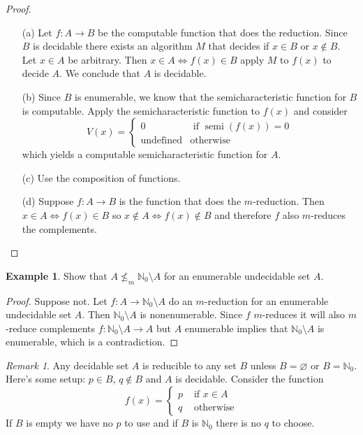 \documentclass[10pt, letterpaper]{article}
\newcommand{\N}{\mathbb{N}}
\theoremstyle{remark}
\newtheorem{rem}{Remark}
\theoremstyle{definition}
\newtheorem{ex}{Example}
\begin{document}
    \begin{proof}
        \begin{enumerate}
            \item[(a)] Let $f:A \rightarrow B$ be the computable function that does the reduction. Since $B$ is decidable there exists
            an algorithm $M$ that decides if $x \in B$ or $x \notin B$. Let $x \in A$ be arbitrary. Then $x \in A \Leftrightarrow f(x) \in B$
            apply $M$ to $f(x)$ to decide $A$. We conclude that $A$ is decidable.
            \item[(b)] Since $B$ is enumerable, we know that the semicharacteristic function for $B$ is computable. Apply the semicharacteristic 
            function to $f(x)$ and consider 
            \[
                V(x) = \begin{cases}
                    0 &\text{ if } \operatorname{semi}(f(x)) = 0 \\
                    \text{undefined} &\text{otherwise}
                \end{cases}
            \]
            which yields a computable semicharacteristic function for $A$.
            \item[(c)] Use the composition of functions.
            \item[(d)] Suppose $f:A \rightarrow B$ is the function that does the $m$-reduction. Then $x \in A \Leftrightarrow f(x) \in B$
            so $x \notin A \Leftrightarrow f(x) \notin B$ and therefore $f$ also $m$-reduces the complements. 
        \end{enumerate}
    \end{proof}

    \begin{ex}
        Show that $A \nleq_m \N_0 \setminus A$ for an enumerable undecidable set $A$.
    \end{ex}

    \begin{proof}
        Suppose not. Let $f: A \rightarrow \N_0 \setminus A$ do an $m$-reduction for an enumerable undecidable set $A$. Then $\N_0 \setminus A$
        is nonenumerable. Since $f$ $m$-reduces it will also $m$-reduce complements $f:\N_0 \setminus A \rightarrow A$
        but $A$ enumerable implies that $\N_0 \setminus A$ is enumerable, which is a contradiction.
    \end{proof}

    \begin{rem}
        Any decidable set $A$ is reducible to any set $B$ unless $B = \varnothing$ or $B = \N_0$. Here's some setup:
        $p \in B$, $q \notin B$ and $A$ is decidable. Consider the function 
        \[
            f(x) = \begin{cases}
                p &\text{ if } x \in A \\
                q &\text{ otherwise}
            \end{cases}
        \]
        If $B$ is empty we have no $p$ to use and if $B$ is $\N_0$ there is no $q$ to choose.
    \end{rem}
\end{document}
